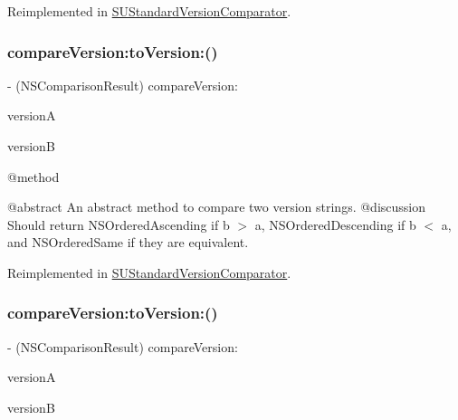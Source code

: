 Reimplemented in \mbox{\hyperlink{interface_s_u_standard_version_comparator_a32eac2a727abd9d3c6890f7ac7ca50f1}{S\+U\+Standard\+Version\+Comparator}}.

\mbox{\label{protocol_s_u_version_comparison-p_a7ee54ef49cade9b0a856bdc8c7fff2f4}} 
\subsubsection{\texorpdfstring{compareVersion:toVersion:()}{compareVersion:toVersion:()}\hspace{0.1cm}{\footnotesize\ttfamily [3/4]}}
{\footnotesize\ttfamily -\/ (N\+S\+Comparison\+Result) compare\+Version\+: \begin{DoxyParamCaption}\item[{(N\+S\+String $\ast$)}]{versionA }\item[{to\+Version\+:(N\+S\+String $\ast$)}]{versionB }\end{DoxyParamCaption}}

@method

@abstract An abstract method to compare two version strings. @discussion Should return N\+S\+Ordered\+Ascending if b $>$ a, N\+S\+Ordered\+Descending if b $<$ a, and N\+S\+Ordered\+Same if they are equivalent. 

Reimplemented in \mbox{\hyperlink{interface_s_u_standard_version_comparator_a32eac2a727abd9d3c6890f7ac7ca50f1}{S\+U\+Standard\+Version\+Comparator}}.

\mbox{\label{protocol_s_u_version_comparison-p_a7ee54ef49cade9b0a856bdc8c7fff2f4}} 
\subsubsection{\texorpdfstring{compareVersion:toVersion:()}{compareVersion:toVersion:()}\hspace{0.1cm}{\footnotesize\ttfamily [4/4]}}
{\footnotesize\ttfamily -\/ (N\+S\+Comparison\+Result) compare\+Version\+: \begin{DoxyParamCaption}\item[{(N\+S\+String $\ast$)}]{versionA }\item[{to\+Version\+:(N\+S\+String $\ast$)}]{versionB }\end{DoxyParamCaption}}

